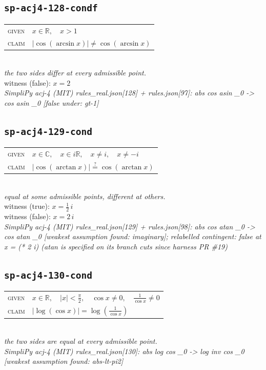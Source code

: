 \documentclass[11pt]{article}
\begin{document}
\subsection*{\texttt{sp-acj4-128-condf}}
\begin{tabular}{@{}l@{\quad}l@{}}
\textsc{given} & $x \in \mathbb{R},\quad x > 1$ \\[4pt]
\textsc{claim} & $\displaystyle \left|\cos\left(\arcsin x\right)\right| \neq \cos\left(\arcsin x\right)$ \\
\end{tabular}\\[2pt]
{\small\emph{the two sides differ at every admissible point.}}\\
{\footnotesize\color{gray}witness (false): $x = 2$}\\
\emph{SimpliPy acj-4 (MIT) rules\_real.json[128] + rules.json[97]: abs cos asin \_0  ->  cos asin \_0  [false under: gt-1]}\\

\subsection*{\texttt{sp-acj4-129-cond}}
\begin{tabular}{@{}l@{\quad}l@{}}
\textsc{given} & $x \in \mathbb{C},\quad x \in i\mathbb{R},\quad x \neq i,\quad x \neq -i$ \\[4pt]
\textsc{claim} & $\displaystyle \left|\cos\left(\arctan x\right)\right| \overset{?}{=} \cos\left(\arctan x\right)$ \\
\end{tabular}\\[2pt]
{\small\emph{equal at some admissible points, different at others.}}\\
{\footnotesize\color{gray}witness (true): $x = \frac{1}{2} \, i$}\\
{\footnotesize\color{gray}witness (false): $x = 2 \, i$}\\
\emph{SimpliPy acj-4 (MIT) rules\_real.json[129] + rules.json[98]: abs cos atan \_0  ->  cos atan \_0  [weakest assumption found: imaginary]; relabelled contingent: false at x = (* 2 i) (atan is specified on its branch cuts since harness PR \#19)}\\

\subsection*{\texttt{sp-acj4-130-cond}}
\begin{tabular}{@{}l@{\quad}l@{}}
\textsc{given} & $x \in \mathbb{R},\quad \left|x\right| < \frac{\pi}{2},\quad \cos x \neq 0,\quad \frac{1}{\cos x} \neq 0$ \\[4pt]
\textsc{claim} & $\displaystyle \left|\log\left(\cos x\right)\right| = \log\left(\frac{1}{\cos x}\right)$ \\
\end{tabular}\\[2pt]
{\small\emph{the two sides are equal at every admissible point.}}\\
\emph{SimpliPy acj-4 (MIT) rules\_real.json[130]: abs log cos \_0  ->  log inv cos \_0  [weakest assumption found: abs-lt-pi2]}\\
\end{document}
